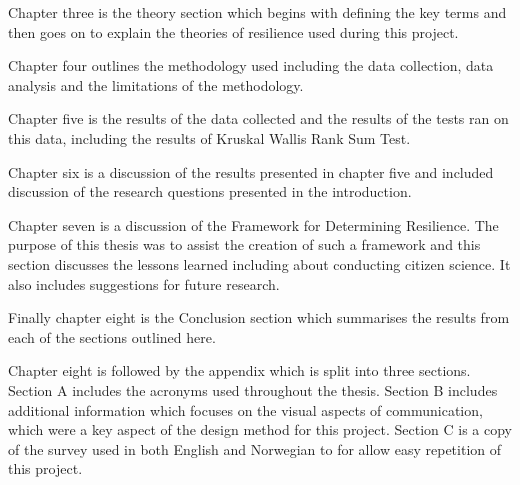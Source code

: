 Chapter three is the theory section which begins with defining the key terms and then goes on to explain the theories of resilience used during this project.

Chapter four outlines the methodology used including the data collection, data analysis and the limitations of the methodology.

Chapter five is the results of the data collected and the results of the tests ran on this data, including the results of Kruskal Wallis Rank Sum Test. 

Chapter six is a discussion of the results presented in chapter five and included discussion of the research questions presented in the introduction. 

Chapter seven is a discussion of the Framework for Determining Resilience. The purpose of this thesis was to assist the creation of such a framework and this section discusses the lessons learned including about conducting citizen science. It also includes suggestions for future research.

Finally chapter eight is the Conclusion section which summarises the results from each of the sections outlined here.

Chapter eight is followed by the appendix which is split into three sections. Section A includes the acronyms used throughout the thesis. Section B includes additional information which focuses on the visual aspects of communication, which were a key aspect of the design method for this project. Section C is a copy of the survey used in both English and Norwegian to for allow easy repetition of this project. 
